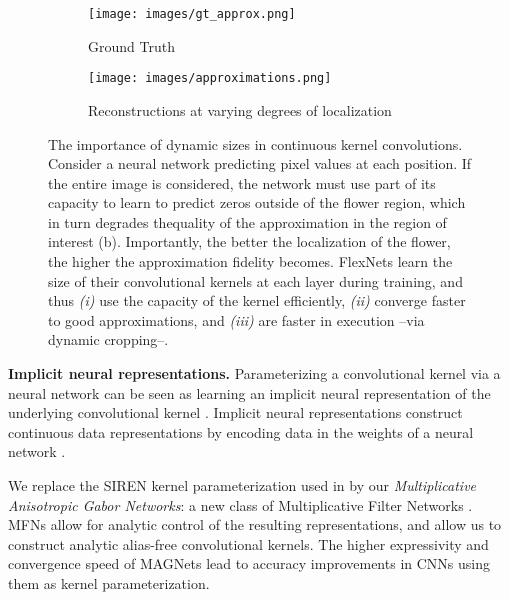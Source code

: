 \documentclass{article} \usepackage{iclr2022_conference,times}
\begin{document}
\begin{figure}
    \centering
     \begin{subfigure}[c]{0.267\textwidth}
         \centering
         \texttt{[image: images/gt\_approx.png]}
         \caption{Ground Truth}
         \label{fig:gt_approx}
     \end{subfigure}
     \hspace{3.5mm}
     \begin{subfigure}[c]{0.677\textwidth}
         \centering
         \texttt{[image: images/approximations.png]}
         \caption{Reconstructions at varying degrees of localization}
         \label{fig:ckernel_approx}
     \end{subfigure}
     \vspace{-2mm}
     \caption{\label{fig:capacity_tradeoff} The importance of dynamic sizes in continuous kernel convolutions. Consider a neural network predicting pixel values at each position. If the entire image is considered, the network must use part of its capacity to learn to predict zeros outside of the flower region, which in turn degrades the\break quality of the approximation in the region of interest (b). Importantly, the better the localization of the flower, the higher the approximation fidelity becomes. FlexNets learn the size of their convolutional kernels at each layer during training, and thus \emph{(i)} use the capacity of the kernel efficiently, \emph{(ii)} converge faster to good approximations, and \emph{(iii)} are faster in execution --via dynamic cropping--.
     \vspace{-3mm}}
\end{figure}

\textbf{Implicit neural representations.} Parameterizing a convolutional kernel via a neural network can be seen as learning an implicit neural representation of the underlying convolutional kernel \citep{romero2021ckconv}. Implicit neural representations construct continuous data representations by encoding data in the weights of a neural network \citep{park2019deepsdf, sitzmann2020implicit, fathony2021multiplicative}. 

We replace the SIREN \citep{sitzmann2020implicit} kernel parameterization used in \cite{romero2021ckconv} by our \textit{Multiplicative Anisotropic Gabor Networks}: a new class of Multiplicative Filter Networks \citep{fathony2021multiplicative}. MFNs allow for analytic control of the resulting representations, and allow us to construct analytic alias-free convolutional kernels. The higher expressivity and convergence speed of MAGNets lead to accuracy improvements in CNNs using them as kernel parameterization.\vspace{-2mm}
\end{document}
